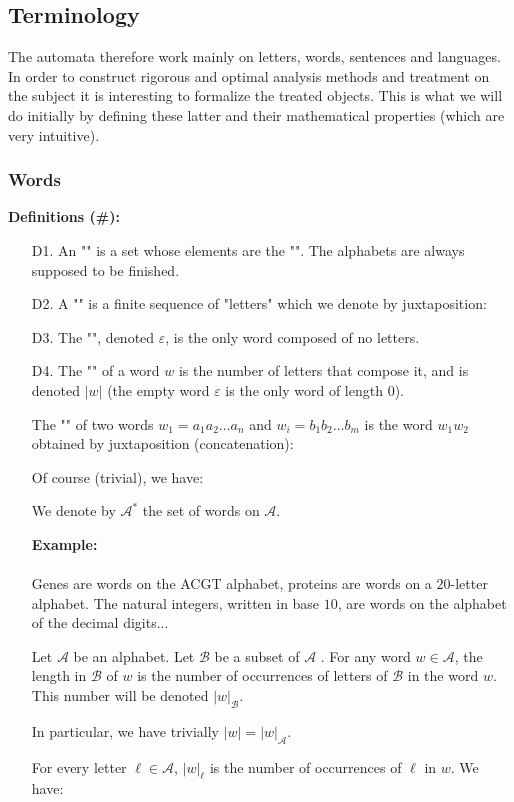 	\pagebreak
	\subsection{Terminology}
	The automata therefore work mainly on letters, words, sentences and languages. In order to construct rigorous and optimal analysis methods and treatment on the subject it is interesting to formalize the treated objects. This is what we will do initially by defining these latter and their mathematical properties (which are very intuitive).
	
	\subsubsection{Words}
	\textbf{Definitions (\#\mydef):}
	\begin{enumerate}
		\item[D1.] An "" is a set whose elements are the "". The alphabets are always supposed to be finished.
		
		\item[D2.] A "" is a finite sequence of "letters" which we denote by juxtaposition:
		
	
		\item[D3.] The "", denoted $\varepsilon$, is the only word composed of no letters.
	
		\item[D4.] The "" of a word $w$ is the number of letters that compose it, and is denoted $|w|$ (the empty word $\varepsilon$ is the only word of length $0$).
	
		The "" of two words $w_1=a_1a_2\ldots a_n$ and $w_i=b_1b_2\ldots b_m$ is the word $w_1w_2$ obtained by juxtaposition (concatenation):
		
		Of course (trivial), we have:
		
		We denote by $\mathcal{A}^{*}$ the set of words on $\mathcal{A}$.
		
		\begin{tcolorbox}[colframe=black,colback=white,sharp corners]
		\textbf{{\Large {}}Example:}\\\\
		Genes are words on the ACGT alphabet, proteins are words on a $20$-letter alphabet. The natural integers, written in base $10$, are words on the alphabet of the decimal digits...
		\end{tcolorbox}
		Let $\mathcal{A}$ be an alphabet. Let $\mathcal{B}$ be a subset of $\mathcal{A}$ . For any word $w\in \mathcal{A}$, the length in  $\mathcal{B}$ of $w$ is the number of occurrences of letters of $\mathcal{B}$ in the word $w$. This number will be denoted $|w|_{\mathcal{B}}$.
		\begin{tcolorbox}[title=Remark,colframe=black,arc=10pt]
		In particular, we have trivially $|w|=|w|_{\mathcal{A}}$.
		\end{tcolorbox}
		For every letter $\ell\in\mathcal{A}$, $|w|_{\ell}$ is the number of occurrences of $\ell$ in $w$. We have:
		

\end{enumerate}
